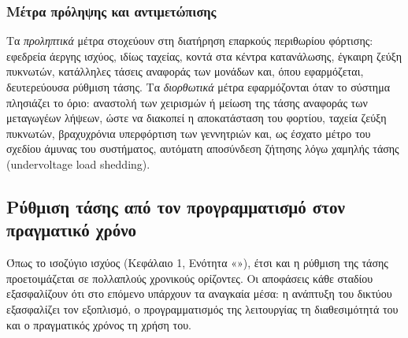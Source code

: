 \subsubsection{Μέτρα πρόληψης και αντιμετώπισης}

Τα \emph{προληπτικά} μέτρα στοχεύουν στη διατήρηση επαρκούς περιθωρίου φόρτισης: εφεδρεία
άεργης ισχύος, ιδίως ταχείας, κοντά στα κέντρα κατανάλωσης, έγκαιρη ζεύξη πυκνωτών, κατάλληλες
τάσεις αναφοράς των μονάδων και, όπου εφαρμόζεται, δευτερεύουσα ρύθμιση τάσης. Τα
\emph{διορθωτικά} μέτρα εφαρμόζονται όταν το σύστημα πλησιάζει το όριο: αναστολή των χειρισμών
ή μείωση της τάσης αναφοράς των μεταγωγέων λήψεων, ώστε να διακοπεί η αποκατάσταση του
φορτίου, ταχεία ζεύξη πυκνωτών, βραχυχρόνια υπερφόρτιση των γεννητριών και, ως έσχατο μέτρο του
σχεδίου άμυνας του συστήματος, αυτόματη αποσύνδεση ζήτησης λόγω χαμηλής τάσης (undervoltage
load shedding).

\subsection{Ρύθμιση τάσης από τον προγραμματισμό στον πραγματικό χρόνο}
\label{sec:v-stages}

Όπως το ισοζύγιο ισχύος (Κεφάλαιο 1, Ενότητα «»), έτσι και η ρύθμιση της
τάσης προετοιμάζεται σε πολλαπλούς χρονικούς ορίζοντες. Οι αποφάσεις κάθε σταδίου εξασφαλίζουν
ότι στο επόμενο υπάρχουν τα αναγκαία μέσα: η ανάπτυξη του δικτύου εξασφαλίζει τον εξοπλισμό, ο
προγραμματισμός της λειτουργίας τη διαθεσιμότητά του και ο πραγματικός χρόνος τη χρήση του.

